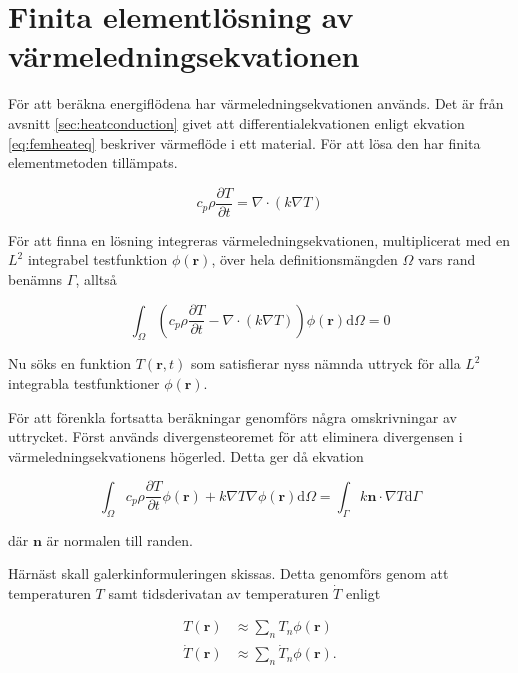 \section{Finita elementlösning av värmeledningsekvationen}
\label{sec:femheat}
För att beräkna energiflödena har värmeledningsekvationen används.
Det är från avsnitt \ref{sec:heatconduction} givet att differentialekvationen
enligt ekvation \eqref{eq:femheateq} beskriver värmeflöde i ett material.
För att lösa den har  finita elementmetoden tillämpats.
 
\begin{equation}
\label{eq:femheateq}
c_p\rho\frac{\partial T}{\partial t} = \nabla\cdot(k\nabla T)
\end{equation}

För att finna en lösning integreras värmeledningsekvationen,
multiplicerat med en $L^2$ integrabel testfunktion $\phi(\mathbf{r})$, över hela
definitionsmängden $\Omega$ vars rand benämns $\Gamma$, alltså

\begin{equation}
\label{eq:femheatweak}
\int_\Omega \left(c_p\rho\frac{\partial T}{\partial t} -
\nabla\cdot(k\nabla T)\right)\phi(\mathbf{r})\mathrm{d}\Omega = 0
\end{equation}

Nu söks en funktion $T(\mathbf{r},t)$ som satisfierar nyss nämnda uttryck för
alla $L^2$ integrabla testfunktioner $\phi(\mathbf{r})$.

För att förenkla fortsatta beräkningar genomförs några
omskrivningar av uttrycket. Först används divergensteoremet för att 
eliminera divergensen i värmeledningsekvationens högerled. Detta ger då
ekvation 

\begin{equation}
\label{eq:femheatweakfull}
\int_\Omega c_p\rho\frac{\partial T}{\partial t}\phi(\mathbf{r}) +
k\nabla T\nabla\phi(\mathbf{r}) \mathrm{d}\Omega =
\int_\Gamma k\mathbf{n}\cdot\nabla T\mathrm{d}\Gamma
\end{equation}

där $\mathbf{n}$ är normalen till randen.

Härnäst skall galerkinformuleringen skissas. Detta genomförs
genom att temperaturen $T$ samt tidsderivatan av temperaturen $\dot{T}$
enligt

\begin{align}
\label{eq:femheatt}
T(\mathbf{r}) & \approx \sum_n T_n\phi(\mathbf{r}) \\
\label{eq:femheattdot}
\dot{T}(\mathbf{r}) & \approx \sum_n \dot{T}_n\phi(\mathbf{r}).
\end{align}


